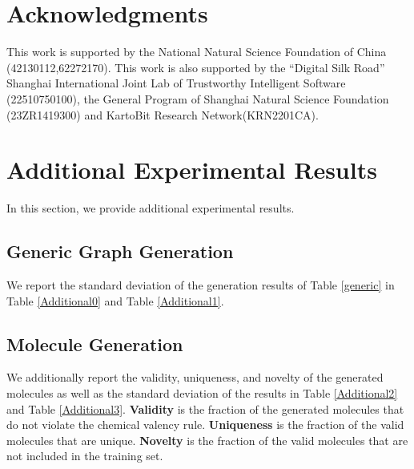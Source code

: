 \documentclass[letterpaper]{article} %
\begin{document}
\section*{Acknowledgments}
This work is supported by the National Natural Science Foundation of China (42130112,62272170). This work
is also supported by the ``Digital Silk Road'' Shanghai International Joint Lab of Trustworthy Intelligent Software (22510750100), the General Program of Shanghai Natural Science Foundation (23ZR1419300) and KartoBit Research Network(KRN2201CA).

\bigskip



\appendix

\setcounter{secnumdepth}{1}
\section{Additional Experimental Results}
In this section, we provide additional experimental results.

\subsection{Generic Graph Generation}
We report the standard deviation of the generation results of Table \ref{generic} in Table \ref{Additional0} and Table \ref{Additional1}.

\subsection{Molecule Generation}
We additionally report the validity, uniqueness, and novelty of the generated molecules as well as the standard deviation of the results in Table \ref{Additional2} and Table \ref{Additional3}. \textbf{Validity} is the fraction of the generated molecules that do not violate the chemical valency rule. \textbf{Uniqueness} is the fraction of the valid molecules that are unique. \textbf{Novelty} is the fraction of the valid molecules that are not included in the training set.
\end{document}
